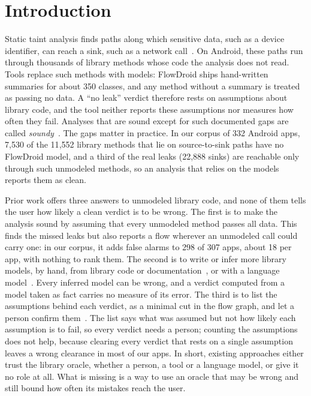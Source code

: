 \section{Introduction}
\label{sec:intro}

Static taint analysis finds paths along which sensitive data, such as a device identifier, can reach a sink, such as a network call~\cite{flowdroid}.
On Android, these paths run through thousands of library methods whose code the analysis does not read.
Tools replace such methods with models: FlowDroid ships hand-written summaries for about 350 classes, and any method without a summary is treated as passing no data.
A ``no leak'' verdict therefore rests on assumptions about library code, and the tool neither reports these assumptions nor measures how often they fail.
Analyses that are sound except for such documented gaps are called \emph{soundy}~\cite{soundiness}.
The gaps matter in practice.
In our corpus of 332 Android apps, 7{,}530 of the 11{,}552 library methods that lie on source-to-sink paths have no FlowDroid model, and a third of the real leaks (22{,}888 sinks) are reachable only through such unmodeled methods, so an analysis that relies on the models reports them as clean.

Prior work offers three answers to unmodeled library code, and none of them tells the user how likely a clean verdict is to be wrong.
The first is to make the analysis sound by assuming that every unmodeled method passes all data.
This finds the missed leaks but also reports a flow wherever an unmodeled call could carry one: in our corpus, it adds false alarms to 298 of 307 apps, about 18 per app, with nothing to rank them.
The second is to write or infer more library models, by hand, from library code or documentation~\cite{stubdroid,atlas,dainfer}, or with a language model~\cite{iris,semtaint,llmdfa,cpghunter}.
Every inferred model can be wrong, and a verdict computed from a model taken as fact carries no measure of its error.
The third is to list the assumptions behind each verdict, as a minimal cut in the flow graph, and let a person confirm them~\cite{bastani-oopsla15}.
The list says what was assumed but not how likely each assumption is to fail, so every verdict needs a person; counting the assumptions does not help, because clearing every verdict that rests on a single assumption leaves a wrong clearance in most of our apps.
In short, existing approaches either trust the library oracle, whether a person, a tool or a language model, or give it no role at all.
What is missing is a way to use an oracle that may be wrong and still bound how often its mistakes reach the user.

